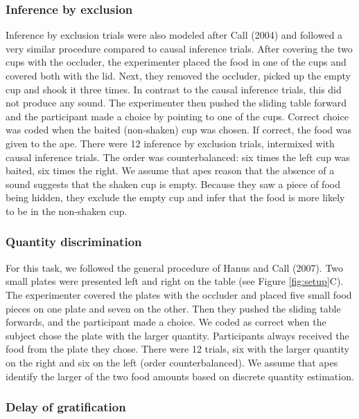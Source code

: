 \documentclass[
  man,floatsintext]{apa6}
\begin{document}
\hypertarget{inference-by-exclusion}{%
\subsubsection{Inference by exclusion}\label{inference-by-exclusion}}

Inference by exclusion trials were also modeled after Call (2004) and followed a very similar procedure compared to causal inference trials. After covering the two cups with the occluder, the experimenter placed the food in one of the cups and covered both with the lid. Next, they removed the occluder, picked up the empty cup and shook it three times. In contrast to the causal inference trials, this did not produce any sound. The experimenter then pushed the sliding table forward and the participant made a choice by pointing to one of the cups. Correct choice was coded when the baited (non-shaken) cup was chosen. If correct, the food was given to the ape. There were 12 inference by exclusion trials, intermixed with causal inference trials. The order was counterbalanced: six times the left cup was baited, six times the right. We assume that apes reason that the absence of a sound suggests that the shaken cup is empty. Because they saw a piece of food being hidden, they exclude the empty cup and infer that the food is more likely to be in the non-shaken cup.

\hypertarget{quantity-discrimination}{%
\subsubsection{Quantity discrimination}\label{quantity-discrimination}}

For this task, we followed the general procedure of Hanus and Call (2007). Two small plates were presented left and right on the table (see Figure \ref{fig:setup}C). The experimenter covered the plates with the occluder and placed five small food pieces on one plate and seven on the other. Then they pushed the sliding table forwards, and the participant made a choice. We coded as correct when the subject chose the plate with the larger quantity. Participants always received the food from the plate they chose. There were 12 trials, six with the larger quantity on the right and six on the left (order counterbalanced). We assume that apes identify the larger of the two food amounts based on discrete quantity estimation.

\hypertarget{delay-of-gratification}{%
\subsubsection{Delay of gratification}\label{delay-of-gratification}}
\end{document}
